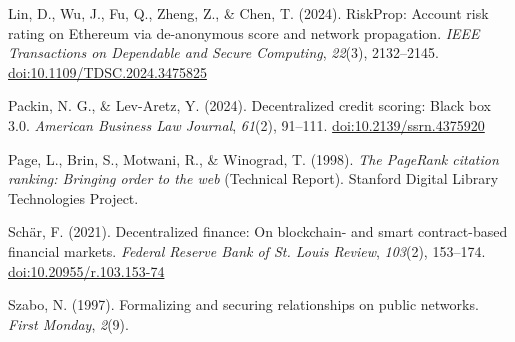 \hangindent=0.5in  Lin, D., Wu, J., Fu, Q., Zheng, Z., \& Chen, T. (2024). RiskProp: Account risk rating on Ethereum via de-anonymous score and network propagation. \textit{IEEE Transactions on Dependable and Secure Computing}, \textit{22}(3), 2132--2145. \href{https://doi.org/10.1109/TDSC.2024.3475825}{doi:10.1109/TDSC.2024.3475825}\par

\hangindent=0.5in  Packin, N. G., \& Lev-Aretz, Y. (2024). Decentralized credit scoring: Black box 3.0. \textit{American Business Law Journal}, \textit{61}(2), 91--111. \href{https://doi.org/10.2139/ssrn.4375920}{doi:10.2139/ssrn.4375920}\par

\hangindent=0.5in  Page, L., Brin, S., Motwani, R., \& Winograd, T. (1998). \textit{The PageRank citation ranking: Bringing order to the web} (Technical Report). Stanford Digital Library Technologies Project.\par

\hangindent=0.5in  Sch\"{a}r, F. (2021). Decentralized finance: On blockchain- and smart contract-based financial markets. \textit{Federal Reserve Bank of St. Louis Review}, \textit{103}(2), 153--174. \href{https://doi.org/10.20955/r.103.153-74}{doi:10.20955/r.103.153-74}\par

\hangindent=0.5in  Szabo, N. (1997). Formalizing and securing relationships on public networks. \textit{First Monday}, \textit{2}(9).\par
